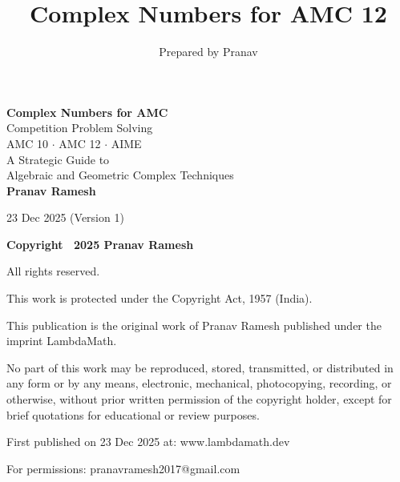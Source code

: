 \documentclass[12pt]{extarticle}
\title{Complex Numbers for AMC 12}
\author{Prepared by Pranav}
\date{}
\begin{document}
\begin{titlepage}
\centering
\vspace*{2cm}

{\Huge\bfseries Complex Numbers for AMC}\\[0.5cm]
{\Large Competition Problem Solving}\\[2cm]

{\large AMC 10 $\cdot$ AMC 12 $\cdot$ AIME}\\[3cm]

{\Large A Strategic Guide to\\[0.3cm]
Algebraic and Geometric Complex Techniques}\\[3cm]

{\Large\textbf{Pranav Ramesh}}\\[3cm]

\vfill

{\large 23 Dec 2025 (Version 1)}
\end{titlepage}

\thispagestyle{empty}
\vspace*{\fill}
\begin{center}
\textbf{\Large Copyright \textcopyright\ 2025 Pranav Ramesh}

All rights reserved.

This work is protected under the Copyright Act, 1957 (India).

\vspace{1.5cm}

This publication is the original work of Pranav Ramesh published under the imprint LambdaMath.

\vspace{1.5cm}

No part of this work may be reproduced, stored, transmitted, or distributed in any form or by any means, electronic, mechanical, photocopying, recording, or otherwise, without prior written permission of the copyright holder, except for brief quotations for educational or review purposes.

\vspace{1.5cm}

First published on 23 Dec 2025 at: www{.}lambdamath{.}dev

For permissions: pranavramesh2017@gmail{.}com
\end{center}
\vspace*{\fill}

\newpage
\end{document}
